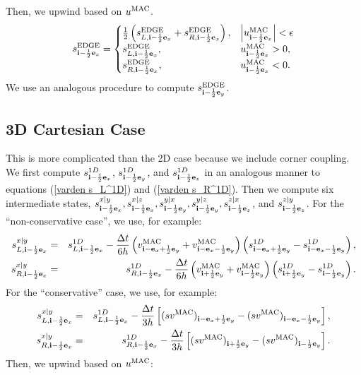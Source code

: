 Then, we upwind based on $u^{\rm MAC}$.
\begin{equation}
s_{{\bf i}-\frac{1}{2}{\bf e}_x}^{\rm EDGE} =
\begin{cases}
\frac{1}{2}\left(s_{L,{\bf i}-\frac{1}{2}{\bf e}_x}^{\rm EDGE} + s_{R,{\bf i}-\frac{1}{2}{\bf e}_x}^{\rm EDGE}\right), & \left|u^{\rm MAC}_{{\bf i}-\frac{1}{2}{\bf e}_x}\right| < \epsilon \\
s_{L,{\bf i}-\frac{1}{2}{\bf e}_x}^{\rm EDGE}, & u^{\rm MAC}_{{\bf i}-\frac{1}{2}{\bf e}_x} > 0, \\
s_{R,{\bf i}-\frac{1}{2}{\bf e}_x}^{\rm EDGE}, & u^{\rm MAC}_{{\bf i}-\frac{1}{2}{\bf e}_x} < 0.
\end{cases}\label{varden s^edge upwind}
\end{equation}
We use an analogous procedure to compute $s_{{\bf i}-\frac{1}{2}{\bf e}_y}^{\rm EDGE}$.

\subsection{3D Cartesian Case}
This is more complicated than the 2D case because we include corner
coupling.  We first compute $s_{{\bf i}-\frac{1}{2}{\bf e}_x}^{1D}$,
$s_{{\bf i}-\frac{1}{2}{\bf e}_y}^{1D}$, and $s_{{\bf i}-\frac{1}{2}{\bf e}_z}^{1D}$ in an
analogous manner to equations (\ref{varden s_L^1D}) and (\ref{varden
  s_R^1D}).  Then we compute six intermediate states,
$s_{{\bf i}-\frac{1}{2}{\bf e}_x}^{x|y}, s_{{\bf i}-\frac{1}{2}{\bf e}_x}^{x|z},
s_{{\bf i}-\frac{1}{2}{\bf e}_y}^{y|x}, s_{{\bf i}-\frac{1}{2}{\bf e}_y}^{y|z},
s_{{\bf i}-\frac{1}{2}{\bf e}_z}^{z|x}$, and $s_{{\bf i}-\frac{1}{2}{\bf e}_z}^{z|y}$.  For the
``non-conservative case'', we use, for example:
\begin{eqnarray}
s_{L,{\bf i}-\frac{1}{2}{\bf e}_x}^{x|y} &=& s_{L,{\bf i}-\frac{1}{2}{\bf e}_x}^{1D} - \frac{\Delta t}{6h}\left(v_{{\bf i}-{\bf e}_x+\frac{1}{2}{\bf e}_y}^{\rm MAC} + v_{{\bf i}-{\bf e}_x-\frac{1}{2}{\bf e}_y}^{\rm MAC}\right)\left(s_{{\bf i}-{\bf e}_x+\frac{1}{2}{\bf e}_y}^{1D} - s_{{\bf i}-{\bf e}_x-\frac{1}{2}{\bf e}_y}^{1D}\right), \\
s_{R,{\bf i}-\frac{1}{2}{\bf e}_x}^{x|y} &=& s_{R,{\bf i}-\frac{1}{2}{\bf e}_x}^{1D} - \frac{\Delta t}{6h}\left(v_{{\bf i}+\frac{1}{2}{\bf e}_y}^{\rm MAC} + v_{{\bf i}-\frac{1}{2}{\bf e}_y}^{\rm MAC}\right)\left(s_{{\bf i}+\frac{1}{2}{\bf e}_y}^{1D} - s_{{\bf i}-\frac{1}{2}{\bf e}_y}^{1D}\right).
\end{eqnarray}
For the ``conservative'' case, we use, for example:
\begin{eqnarray}
s_{L,{\bf i}-\frac{1}{2}{\bf e}_x}^{x|y} &=& s_{L,{\bf i}-\frac{1}{2}{\bf e}_x}^{1D} - \frac{\Delta t}{3h}\left[(sv^{\rm MAC})_{{\bf i}-{\bf e}_x+\frac{1}{2}{\bf e}_y}-(sv^{\rm MAC})_{{\bf i}-{\bf e}_x-\frac{1}{2}{\bf e}_y}\right], \\
s_{R,{\bf i}-\frac{1}{2}{\bf e}_x}^{x|y} &=& s_{R,{\bf i}-\frac{1}{2}{\bf e}_x}^{1D} - \frac{\Delta t}{3h}\left[(sv^{\rm MAC})_{{\bf i}+\frac{1}{2}{\bf e}_y}-(sv^{\rm MAC})_{{\bf i}-\frac{1}{2}{\bf e}_y}\right].
\end{eqnarray}
Then, we upwind based on $u^{\rm MAC}$:
